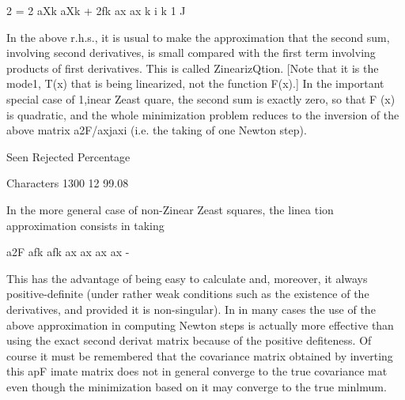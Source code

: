  
 
 
 
 
 
 
 
 
 
 
 
 
 
 
 
 
 
 
 
 
 
 
 
 
 
 
 
 
 
 
 
 
 
 
 
 
 
 
 
 
 
 
                                            2
                    =   2 aXk aXk +  2fk ax ax
                           k      i       k        1  J
 
 
In the above r.h.s., it is usual to make the approximation that the
second sum, involving second derivatives, is small compared with the
first term involving products of first derivatives.  This is called
ZinearizQtion.  [Note that it is the mode1, T(x) that is being linearized,
not the function F(x).]  In the important special case of 1,inear Zeast
quare, the second sum is exactly zero, so that F (x) is quadratic, and
the whole minimization problem reduces to the inversion of the above
matrix a2F/axjaxi (i.e. the taking of one Newton step).
 
                 Seen Rejected  Percentage
 
Characters       1300       12   99.08
 
 
     In the more general case of non-Zinear Zeast squares, the linea
tion approximation consists in taking
 
                     a2F        afk afk
                     ax ax   ax ax -
 
 
This has the advantage of being easy to calculate and, moreover, it
always positive-definite (under rather weak conditions such as the
existence of the derivatives, and provided it is non-singular).  In
in many cases the use of the above approximation in computing Newton
steps is actually more effective than using the exact second derivat
matrix because of the positive defiteness.  Of course it must be
remembered that the covariance matrix obtained by inverting this apF
imate matrix does not in general converge to the true covariance mat
even though the minimization  based on it may converge to the true
minlmum.
 
